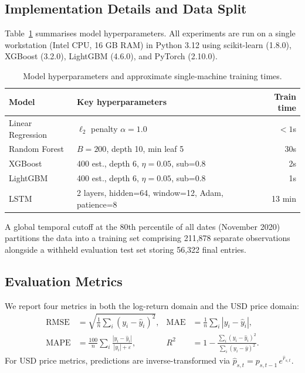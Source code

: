 \documentclass[runningheads]{llncs}
\begin{document}
\subsection{Implementation Details and Data Split}
\label{sec:implementation}

Table~\ref{tab:hyperparams} summarises model hyperparameters.
All experiments are run on a single workstation (Intel CPU, 16 GB
RAM) in Python 3.12 using scikit-learn (1.8.0), XGBoost (3.2.0),
LightGBM (4.6.0), and PyTorch (2.10.0).

\begin{table}[t]
\caption{Model hyperparameters and approximate single-machine training times.}
\label{tab:hyperparams}
\centering
\begin{tabular}{llr}
\toprule
\textbf{Model} & \textbf{Key hyperparameters} & \textbf{Train time} \\
\midrule
Linear Regression & $\ell_2$ penalty $\alpha=1.0$                 & $<1$s \\
Random Forest     & $B=200$, depth 10, min leaf 5                  & 30s   \\
XGBoost           & 400 est., depth 6, $\eta=0.05$, sub=0.8       & 2s    \\
LightGBM          & 400 est., depth 6, $\eta=0.05$, sub=0.8       & 1s    \\
LSTM              & 2 layers, hidden=64, window=12, Adam, patience=8 & 13 min\\
\bottomrule
\end{tabular}
\end{table}

A global temporal cutoff at the 80th percentile of all dates (November 2020) partitions the data into a training set comprising 211{,}878 separate observations alongside a withheld evaluation test set storing 56{,}322 final entries.

\subsection{Evaluation Metrics}
\label{sec:metrics}

We report four metrics in both the log-return domain and the
USD price domain:
\begin{align}
  \text{RMSE} &= \sqrt{\tfrac{1}{n}\textstyle\sum_{i}(y_i-\hat{y}_i)^2},
               &
  \text{MAE}  &= \tfrac{1}{n}\textstyle\sum_{i}|y_i-\hat{y}_i|, \\[2pt]
  \text{MAPE} &= \tfrac{100}{n}\textstyle\sum_{i}
               \frac{|y_i-\hat{y}_i|}{|y_i|+\varepsilon},
               &
  R^2         &= 1 - \frac{\sum_i(y_i-\hat{y}_i)^2}
                           {\sum_i(y_i-\bar{y})^2}.
\end{align}
For USD price metrics, predictions are inverse-transformed via
$\hat{p}_{s,t} = p_{s,t-1}\,e^{\hat{r}_{s,t}}$.
\end{document}
